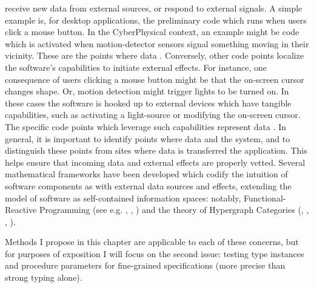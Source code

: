 {\begin{enumerate}
receive new data from external sources, or respond to 
external signals.  A simple example is, for desktop applications, 
the preliminary code which runs when users click a mouse button.  
In the CyberPhysical context, an example might be code which 
is activated when motion-detector sensors signal something moving 
in their vicinity.  These are the  points where data 
.
\pseudoIndent{}
Conversely, other code points localize 
the software's capabilities to initiate external effects.  For 
instance, one consequence of users clicking a mouse button might 
be that the on-screen cursor changes shape.  Or, motion detection 
might trigger lights to be turned on.  In these cases the software 
is hooked up to external devices which have tangible capabilities, 
such as activating a light-source or modifying the on-screen cursor.  
The specific code points which leverage such capabilities 
represent data .  
\pseudoIndent{}
In general, it is important to identify points where data 
 and  the system, and to distinguish 
these points from sites where data is transferred 
 the application.  This helps ensure that 
incoming data and external effects are properly vetted.  
Several mathematical frameworks have been developed 
which codify the intuition of software components as 
 with external data sources and effects, 
extending the model of software as self-contained 
information spaces: notably, Functional-Reactive Programming 
(see e.g. \cite{WolfgangJeltsch}, \cite{JenniferPaykin},
\cite{PaykinKrishnaswami}) and the theory of
Hypergraph Categories 
(\cite{InteractingConceptualSpaces}, \cite{BrendanFong}, 
\cite{BrendanFongThesis}, \cite{AleksKissinger}). 
\end{enumerate}
Methods I propose in this chapter are applicable to each 
of these concerns, but for purposes of exposition I 
will focus on the second issue: testing 
type instances and procedure parameters for fine-grained 
specifications (more precise than strong typing alone). 
}
